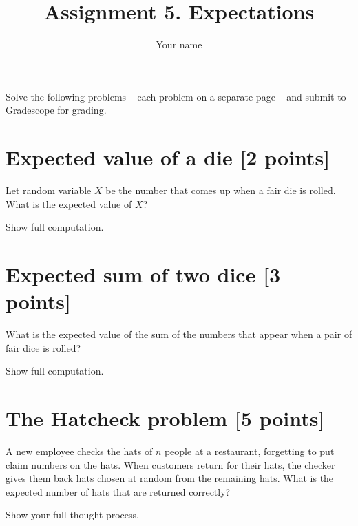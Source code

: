 \documentclass{article}
\title{Assignment 5. Expectations}
\author{Your name}
\begin{document}
\maketitle


Solve the following problems -- each problem on a separate page -- and submit to Gradescope for grading. 

\newpage
\section{Expected value of a die [2 points]}
Let random variable $X$ be the number that comes up when a fair die is rolled. What
is the expected value of $X$?

Show full computation.

\newpage
\section{Expected sum of two dice [3 points]}
What is the expected value of the sum of the numbers that appear when a pair of fair dice is
rolled?

Show full computation.

\newpage
\section{The Hatcheck problem [5 points]}
A new employee checks the hats of $n$ people at a
restaurant, forgetting to put claim numbers on the hats. When customers return for their
hats, the checker gives them back hats chosen at random from the remaining hats. What is the
expected number of hats that are returned correctly?

Show your full thought process.
\end{document}
